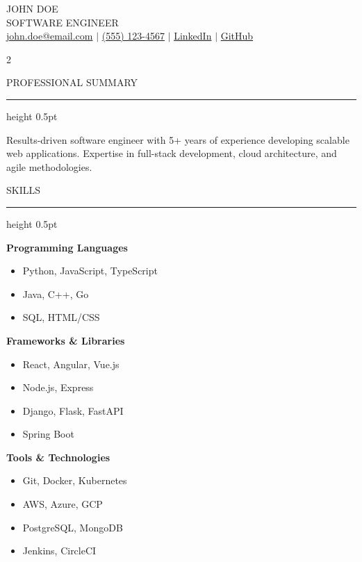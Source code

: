 \documentclass[11pt,letterpaper]{article}
\newcommand{\resumesection}[1]{%
  \vspace{0.2cm}
  {\headerfont\large\color{headercolor} #1}
  \vspace{0.1cm}
  \hrule height 0.5pt
  \vspace{0.15cm}
}
\begin{document}
\begin{center}
  {\Huge\headerfont\color{headercolor} JOHN DOE}\\[5pt]
  {\large\color{accentcolor} SOFTWARE ENGINEER}\\[8pt]
  \href{mailto:john.doe@email.com}{john.doe@email.com} $|$
  \href{tel:+15551234567}{(555) 123-4567} $|$
  \href{https://linkedin.com/in/johndoe}{LinkedIn} $|$
  \href{https://github.com/johndoe}{GitHub}
\end{center}

\vspace{0.3cm}

\begin{multicols}{2}

\resumesection{PROFESSIONAL SUMMARY}
Results-driven software engineer with 5+ years of experience developing scalable web applications. Expertise in full-stack development, cloud architecture, and agile methodologies.

\resumesection{SKILLS}

\textbf{Programming Languages}
\begin{itemize}[leftmargin=*, nosep]
  \item Python, JavaScript, TypeScript
  \item Java, C++, Go
  \item SQL, HTML/CSS
\end{itemize}

\vspace{0.2cm}

\textbf{Frameworks \& Libraries}
\begin{itemize}[leftmargin=*, nosep]
  \item React, Angular, Vue.js
  \item Node.js, Express
  \item Django, Flask, FastAPI
  \item Spring Boot
\end{itemize}

\vspace{0.2cm}

\textbf{Tools \& Technologies}
\begin{itemize}[leftmargin=*, nosep]
  \item Git, Docker, Kubernetes
  \item AWS, Azure, GCP
  \item PostgreSQL, MongoDB
  \item Jenkins, CircleCI
\end{itemize}


\end{multicols}
\end{document}
